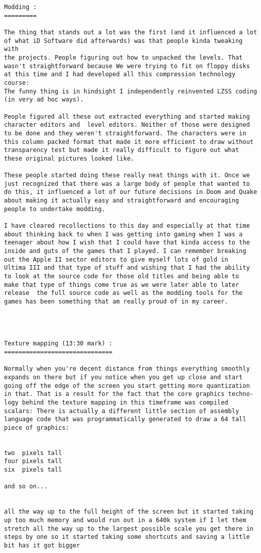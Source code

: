 \documentclass[book.tex]{subfiles}
\begin{document}
\begin{breakable_box}
\begin{verbatim}
Modding :
=========

The thing that stands out a lot was the first (and it influenced a lot
of what iD Software did afterwards) was that people kinda tweaking with
the projects. People figuring out how to unpacked the levels. That 
wasn't straightforward because We were trying to fit on floppy disks 
at this time and I had developed all this compression technology course:
The funny thing is in hindsight I independently reinvented LZSS coding 
(in very ad hoc ways). 

People figured all these out extracted everything and started making 
character editors and  level editors. Neither of those were designed 
to be done and they weren't straightforward. The characters were in 
this column packed format that made it more efficient to draw without 
transparency test but made it really difficult to figure out what 
these original pictures looked like. 

These people started doing these really neat things with it. Once we 
just recognized that there was a large body of people that wanted to 
do this, it influenced a lot of our future decisions in Doom and Quake 
about making it actually easy and straightforward and encouraging 
people to undertake modding.

I have cleared recollections to this day and especially at that time 
about thinking back to when I was getting into gaming when I was a 
teenager about how I wish that I could have that kinda access to the 
inside and guts of the games that I played. I can remember breaking 
out the Apple II sector editors to give myself lots of gold in 
Ultima III and that type of stuff and wishing that I had the ability 
to look at the source code for those old titles and being able to 
make that type of things come true as we were later able to later 
release  the full source code as well as the modding tools for the 
games has been something that am really proud of in my career.




Texture mapping (13:30 mark) :
==============================

Normally when you're decent distance from things everything smoothly 
expands on there but if you notice when you get up close and start 
going off the edge of the screen you start getting more quantization 
in that. That is a result for the fact that the core graphics techno-
logy behind the texture mapping in this timeframe was compiled 
scalars: There is actually a different little section of assembly 
language code that was programmatically generated to draw a 64 tall 
piece of graphics:


two  pixels tall 
four pixels tall 
six  pixels tall

and so on...


all the way up to the full height of the screen but it started taking 
up too much memory and would run out in a 640k system if I let them 
stretch all the way up to the largest possible scale you get there in 
steps by one so it started taking some shortcuts and saving a little 
bit has it got bigger
   
   \end{verbatim}
\end{breakable_box}
\end{document}
